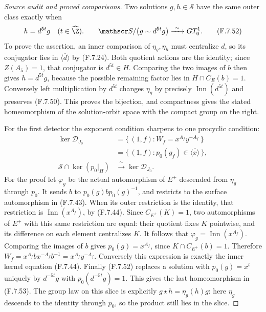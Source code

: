 \begin{proof}[Source audit and proved comparisons]
Two solutions $g,h\in\mathscr S$ have the same
outer class exactly when
\[
                   h=d^{5t}g\quad(t\in\widehat\Z).
 \qquad
 \mathscr S/\bigl(g\sim d^{5t}g\bigr)
                         \xrightarrow{\ \sim\ }GT_0^1.
                                                               \tag{F.7.52}
\]
To prove the assertion, an inner comparison of
$\eta_g,\eta_h$ must centralize $d$, so its
conjugator lies in $\overline{\langle d\rangle}$
by (F.7.24).  Both quotient actions are the
identity; since $Z(A_5)=1$, that conjugator is
$d^{5t}\in H$.  Comparing the two images of $b$
then gives $h=d^{5t}g$, because the possible
remaining factor lies in
$H\cap C_E(b)=1$.  Conversely left multiplication
by $d^{5t}$ changes $\eta_g$ by precisely
$\operatorname{Inn}(d^{5t})$ and preserves
(F.7.50).
This proves the bijection, and compactness gives
the stated homeomorphism of the solution-orbit
space with the compact group on the right.

For the first detector the exponent condition
sharpens to one procyclic condition:
\[
 \begin{split}
 \ker\mathcal D_{J_0}
   &=\{\, (1,f):W_f=x^{A_f}y^{-A_f}\,\}\\
   &=\{\, (1,f):p_0(g_f)\in
                            \overline{\langle x\rangle}\,\},\\
 \mathscr S\cap\ker(p_0|_H)
   &\xrightarrow{\ \sim\ }\ker\mathcal D_{J_0}.
 \end{split}                                                   \tag{F.7.53}
\]
For the proof let $\varphi_g$ be the actual
automorphism of $E^+$ descended from $\eta_g$
through $p_0$.  It sends $b$ to
$p_0(g)b p_0(g)^{-1}$, and restricts to the
surface automorphism in (F.7.43).
When its outer restriction is the identity,
that restriction is $\operatorname{Inn}(x^{A_f})$,
by (F.7.44).  Since $C_{E^+}(K)=1$, two
automorphisms of $E^+$ with this same restriction
are equal: their quotient fixes $K$ pointwise,
and its difference on each element centralizes
$K$.  It follows that
$\varphi_g=\operatorname{Inn}(x^{A_f})$.
Comparing the images of $b$ gives
$p_0(g)=x^{A_f}$, since
$K\cap C_{E^+}(b)=1$.
Therefore
$W_f=x^{A_f}b x^{-A_f}b^{-1}=x^{A_f}y^{-A_f}$.
Conversely this expression is exactly the inner
kernel equation (F.7.44).
Finally (F.7.52) replaces a solution with
$p_0(g)=x^t$ uniquely by $d^{-5t}g$ with
$p_0(d^{-5t}g)=1$.  This gives the last
homeomorphism in (F.7.53).
The group law on this slice is explicitly
$g\star h=\eta_g(h)g$: here $\eta_g$ descends
to the identity through $p_0$, so the product
still lies in the slice.


\end{proof}
